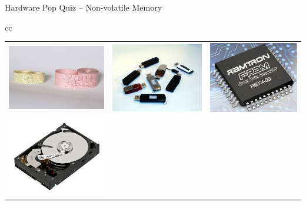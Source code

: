 \documentclass[compress,11pt,xcolor=svgnames,aspectratio=169]{beamer}
\begin{document}
\begin{frame}[fragile] {Hardware Pop Quiz -- Non-volatile Memory}

\begin{center}

\begin{tabular}{cc}

\begin{tabular}{ccc}
\includegraphics[scale=0.2 ]{fig/paper-tape} &
\includegraphics[scale=0.2 ]{fig/usb} &
\includegraphics[scale=0.2 ]{fig/fram} \\
\includegraphics[scale=0.2 ]{fig/disk} &

\end{tabular}
\end{tabular}
\end{center}
\end{frame}
\end{document}
